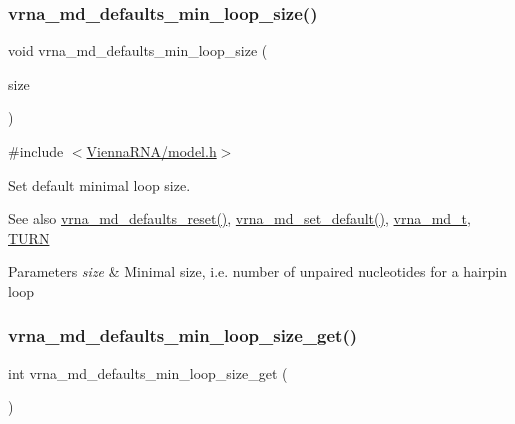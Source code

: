 \subsubsection{\texorpdfstring{vrna\+\_\+md\+\_\+defaults\+\_\+min\+\_\+loop\+\_\+size()}{vrna\_md\_defaults\_min\_loop\_size()}}
{\footnotesize\ttfamily void vrna\+\_\+md\+\_\+defaults\+\_\+min\+\_\+loop\+\_\+size (\begin{DoxyParamCaption}\item[{int}]{size }\end{DoxyParamCaption})}



{\ttfamily \#include $<$\mbox{\hyperlink{model_8h}{Vienna\+R\+N\+A/model.\+h}}$>$}



Set default minimal loop size. 

\begin{DoxySeeAlso}{See also}
\mbox{\hyperlink{group__model__details_ga70834424cf804d149937de89f80ceb45}{vrna\+\_\+md\+\_\+defaults\+\_\+reset()}}, \mbox{\hyperlink{group__model__details_ga8ac6ff84936282436f822644bf841f66}{vrna\+\_\+md\+\_\+set\+\_\+default()}}, \mbox{\hyperlink{group__model__details_ga1f8a10e12a0a1915f2a4eff0b28ea17c}{vrna\+\_\+md\+\_\+t}}, \mbox{\hyperlink{energy__const_8h_ae646250fd59311356c7e5722a81c3a96}{T\+U\+RN}} 
\end{DoxySeeAlso}

\begin{DoxyParams}{Parameters}
{\em size} & Minimal size, i.\+e. number of unpaired nucleotides for a hairpin loop \\
\hline
\end{DoxyParams}
\mbox{\label{group__model__details_ga5cc691174a75c652807dc361b617632a}} 
\subsubsection{\texorpdfstring{vrna\+\_\+md\+\_\+defaults\+\_\+min\+\_\+loop\+\_\+size\+\_\+get()}{vrna\_md\_defaults\_min\_loop\_size\_get()}}
{\footnotesize\ttfamily int vrna\+\_\+md\+\_\+defaults\+\_\+min\+\_\+loop\+\_\+size\+\_\+get (\begin{DoxyParamCaption}\item[{void}]{ }\end{DoxyParamCaption})}



